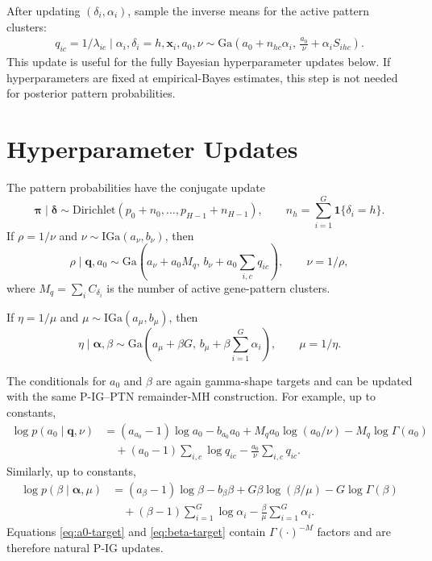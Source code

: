 \documentclass[11pt]{article}
\newcommand{\Ga}{\mathrm{Ga}}
\newcommand{\IGa}{\mathrm{IGa}}
\newcommand{\Dir}{\mathrm{Dirichlet}}
\begin{document}
After updating \((\delta_i,\alpha_i)\), sample the inverse means for the
active pattern clusters:
\begin{align}
  q_{ic}=1/\lambda_{ic}
  \mid \alpha_i,\delta_i=h,\bm x_i,a_0,\nu
  \sim
  \Ga\!\left(
    a_0+n_{hc}\alpha_i,\,
    \frac{a_0}{\nu}+\alpha_i S_{ihc}
  \right).
  \label{eq:q-update}
\end{align}
This update is useful for the fully Bayesian hyperparameter updates below.
If hyperparameters are fixed at empirical-Bayes estimates, this step is not
needed for posterior pattern probabilities.

\section{Hyperparameter Updates}

The pattern probabilities have the conjugate update
\[
  \bm\pi\mid \bm\delta
  \sim
  \Dir\!\left(p_0+n_0,\ldots,p_{H-1}+n_{H-1}\right),
  \qquad
  n_h=\sum_{i=1}^G \mathbf{1}\{\delta_i=h\}.
\]
If \(\rho=1/\nu\) and \(\nu\sim \IGa(a_\nu,b_\nu)\), then
\[
  \rho\mid \bm q,a_0
  \sim
  \Ga\!\left(
    a_\nu+a_0M_q,\,
    b_\nu+a_0\sum_{i,c} q_{ic}
  \right),
  \qquad
  \nu=1/\rho,
\]
where \(M_q=\sum_i C_{\delta_i}\) is the number of active gene-pattern
clusters.

If \(\eta=1/\mu\) and \(\mu\sim \IGa(a_\mu,b_\mu)\), then
\[
  \eta\mid \bm\alpha,\beta
  \sim
  \Ga\!\left(
    a_\mu+\beta G,\,
    b_\mu+\beta\sum_{i=1}^G\alpha_i
  \right),
  \qquad
  \mu=1/\eta.
\]

The conditionals for \(a_0\) and \(\beta\) are again gamma-shape targets and
can be updated with the same P-IG--PTN remainder-MH construction.  For example,
up to constants,
\begin{align}
  \log p(a_0\mid \bm q,\nu)
  &=
  (a_{a_0}-1)\log a_0-b_{a_0}a_0
  +M_q a_0\log(a_0/\nu)
  -M_q\log\Gamma(a_0) \nonumber\\
  &\quad
  +(a_0-1)\sum_{i,c}\log q_{ic}
  -\frac{a_0}{\nu}\sum_{i,c}q_{ic}.
  \label{eq:a0-target}
\end{align}
Similarly, up to constants,
\begin{align}
  \log p(\beta\mid \bm\alpha,\mu)
  &=
  (a_\beta-1)\log\beta-b_\beta\beta
  +G\beta\log(\beta/\mu)
  -G\log\Gamma(\beta) \nonumber\\
  &\quad
  +(\beta-1)\sum_{i=1}^G\log\alpha_i
  -\frac{\beta}{\mu}\sum_{i=1}^G\alpha_i.
  \label{eq:beta-target}
\end{align}
Equations \eqref{eq:a0-target} and \eqref{eq:beta-target} contain
\(\Gamma(\cdot)^{-M}\) factors and are therefore natural P-IG updates.
\end{document}

